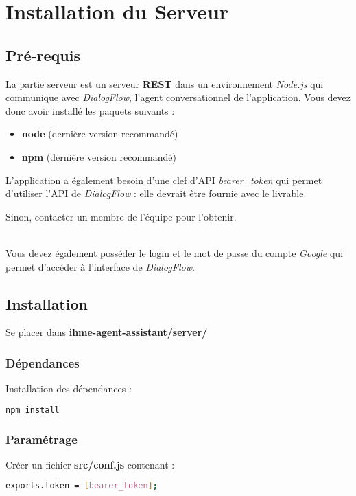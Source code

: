\chapter{Installation du Serveur}

\section{Pré-requis}
La partie serveur est un serveur \textbf{REST} dans un environnement \emph{Node.js} qui communique avec \emph{DialogFlow}, l'agent conversationnel de l'application. Vous devez donc avoir installé les paquets suivants :
\begin{itemize}
\item \textbf{node} (dernière version recommandé)
\item \textbf{npm} (dernière version recommandé)\\
\end{itemize}


L'application a également besoin d'une clef d'API \og \emph{bearer\_token} \fg{} qui permet d'utiliser l'API de \emph{DialogFlow} : elle devrait être fournie avec le livrable. 

Sinon, contacter un membre de l'équipe pour l'obtenir.

~\\\indent
Vous devez également posséder le login et le mot de passe du compte \emph{Google} qui permet d'accéder à l'interface de \emph{DialogFlow}.

\section{Installation}

Se placer dans \textbf{ihme-agent-assistant/server/}

\subsection{Dépendances}

Installation des dépendances :
  \begin{lstlisting}[language=bash]
    npm install
  \end{lstlisting}

\subsection{Paramétrage}

Créer un fichier \textbf{src/conf.js} contenant :
\begin{lstlisting}[language=bash]
    exports.token = [bearer_token];
\end{lstlisting}

